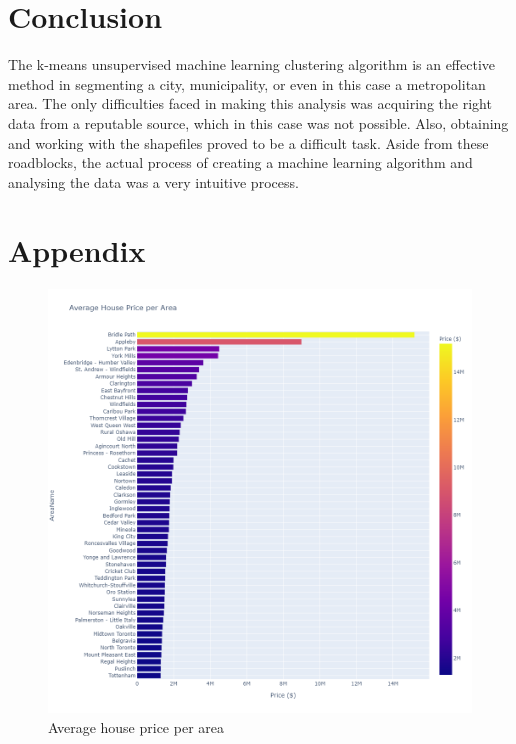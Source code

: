 \documentclass{article}
\begin{document}
\section{Conclusion}

The k-means unsupervised machine learning clustering algorithm is an effective method in segmenting a city, municipality, or even in this case a metropolitan area. The only difficulties faced in making this analysis was acquiring the right data from a reputable source, which in this case was not possible. Also, obtaining and working with the shapefiles proved to be a difficult task. Aside from these roadblocks, the actual process of creating a machine learning algorithm and analysing the data was a very intuitive process.



\clearpage
\section{Appendix}

\begin{figure}[h]
	\centering
	\includegraphics[width=\textwidth]{house-price-plot3.png}
	\caption{Average house price per area}
	\label{price}
\end{figure}
\end{document}
